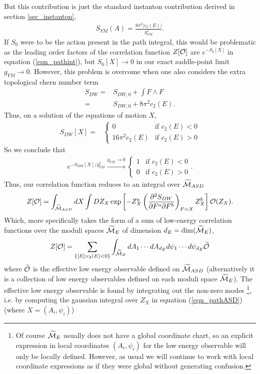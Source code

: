 \documentclass[12pt, onecolumn]{article}
\begin{document}
\noindent But this contribution is just the standard instanton contribution derived in section \ref{sec_instanton},
\begin{align*}
S_{YM}(A)=\frac{8 \pi^2|c_{2}(E)|}{g_{YM}^2}.
\end{align*}
If $S_{0}$ were to be the action present in the path integral, this would be problematic as the leading order factors of the correlation function $Z[{\cal O}]$ are $e^{-S_{0}[X]}$ in equation (\ref{eqn_pathint}), but $S_{0}[X] \rightarrow 0$ in our exact saddle-point limit $g_{YM} \rightarrow 0$.  However, this problem is overcome when one also considers the extra topological chern number term 
\begin{align*}
S_{DW}=&S_{DW,0}+\int F \wedge F\\
=&S_{DW,0}+8 \pi^2 c_{2}(E).
\end{align*}
Thus, on a solution of the equations of motion $X$,
\begin{align*}
S_{DW}[X]=&
\left\{
\begin{array}{cc}
0 & \text{if $c_{2}(E)<0$}\\
16 \pi^2c_{2}(E) & \text{if $c_{2}(E)>0$}
\end{array}
\right.
\end{align*}
So we conclude that
\begin{align*}
 e^{-S_{DW}[X]/g_{YM}^2} \overset{g_{YM}\rightarrow 0}{\longrightarrow}
\left \{
\begin{array}{cc}
1 & \text{if $c_{2}(E)<0$}\\
0 & \text{if $c_{2}(E)>0$}
\end{array}.
\right.
\end{align*}
Thus, our correlation function reduces to an integral over $\widetilde{\cal M}_{ASD}$
\begin{align}
Z[{\cal O}]=\int_{\widetilde{\cal M}_{ASD}}dX\int DZ_{X} \exp\left[-Z_{X}^{a}\left(\frac{\partial^2 S_{DW}}{\partial F^{a} \partial F^{b}}\right)_{F=X}Z_{X}^{b}\right]{\cal O}(Z_{X}).
\label{eqn_pathASD}
\end{align}
Which, more specifically takes the form of a sum of low-energy correlation functions over the moduli spaces $\widetilde{{\cal M}}_{E}$ of dimension $d_{E}=\dim(\widetilde{{\cal M}}_{E})$,
\begin{align}
Z[{\cal O}]=\sum_{\left\{[E]:c_{2}(E)<0\right\}}\int_{\widetilde{{\cal M}}_{E}}dA_{1}\cdots dA_{d_{E}} d\psi_{1}\cdots d\psi_{d_{E}}\widetilde{{\cal O}}
\label{eqn_lowenergycorr}
\end{align}
where $\widetilde{\cal O}$ is the effective low energy observable defined on $\widetilde{\cal M}_{ASD}$ (alternatively it is a collection of low energy observables defined on each moduli space $\widetilde{{\cal M}}_{E}$).  The effective low energy observable is found by integrating out the non-zero modes \footnote{Of course $\widetilde{{\cal M}}_{E}$ usually does not have a global coordinate chart, so an explicit expression in local coordinates $(A_{i},\psi_{i})$ for the low energy observable will only be locally defined.  However, as usual we will continue to work with local coordinate expressions as if they were global without generating confusion.}, i.e. by computing the gaussian integral over $Z_{X}$ in equation (\ref{eqn_pathASD}) (where $X=(A_{i},\psi_{i})$)
\end{document}
